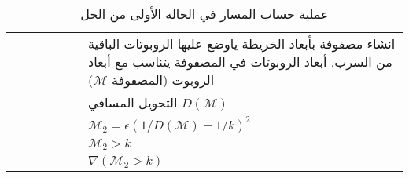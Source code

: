 

	\begin{table}
		\centering
		\begin{tabular}{cp{150pt}}
			\begin{subfigure}{0.35\textwidth}
				\centering
				
			\end{subfigure}&  انشاء مصفوفة بأبعاد الخريطة ياوضع عليها الروبوتات الباقية من السرب. أبعاد الروبوتات في المصفوفة يتناسب مع أبعاد الروبوت (المصفوفة $\mathcal{M}$) \\
			\begin{subfigure}{0.35\textwidth}
				\centering
				
			\end{subfigure}& التحويل المسافي $D(\mathcal{M})$\\
			\begin{subfigure}{0.35\textwidth}
				\centering
				
			\end{subfigure}&  $\mathcal{M}_2 = \epsilon (1/D(\mathcal{M}) - 1/k )^2$ \\
			\begin{subfigure}{0.35\textwidth}
				\centering
				
			\end{subfigure}& $ \mathcal{M}_2 > k $ \\
			\begin{subfigure}{0.35\textwidth}
				\centering
				
			\end{subfigure}& $ \nabla (\mathcal{M}_2 > k) $
		\end{tabular}
		\caption{عملية حساب المسار في الحالة الأولى من الحل}
		\label{11:fig:process}
	\end{table}
